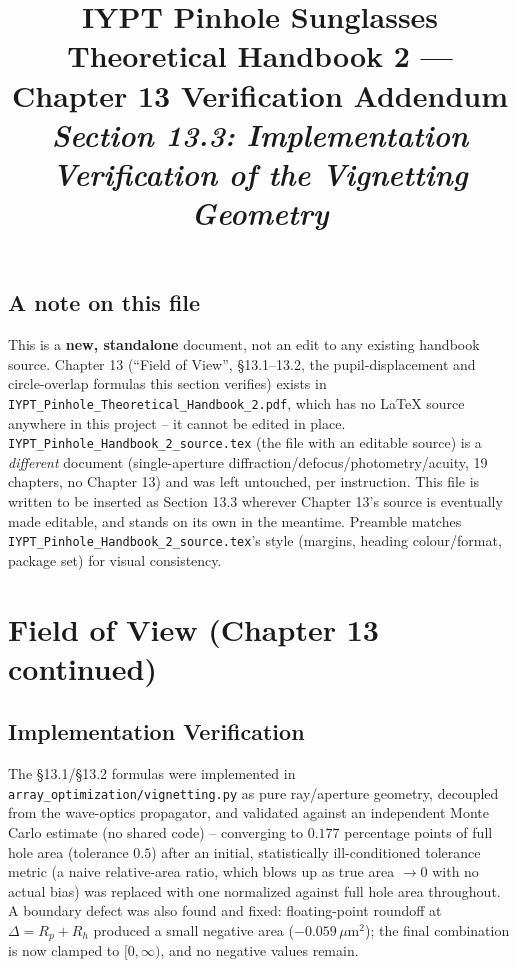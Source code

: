 \documentclass[11pt]{report}
\title{\textbf{\Huge IYPT Pinhole Sunglasses}\\[0.3cm]\textcolor{hbblue}{\huge Theoretical Handbook 2 --- Chapter 13 Verification Addendum}\\[0.5cm]
\large\itshape Section 13.3: Implementation Verification of the Vignetting Geometry}
\author{}
\date{}
\begin{document}
\maketitle
\tableofcontents

\section*{A note on this file}
This is a \textbf{new, standalone} document, not an edit to any existing handbook source.
Chapter 13 (``Field of View'', \S13.1--13.2, the pupil-displacement and circle-overlap
formulas this section verifies) exists in \texttt{IYPT\_Pinhole\_Theoretical\_Handbook\_2.pdf},
which has no \LaTeX{} source anywhere in this project -- it cannot be edited in place.
\texttt{IYPT\_Pinhole\_Handbook\_2\_source.tex} (the file with an editable source) is a
\emph{different} document (single-aperture diffraction/defocus/photometry/acuity, 19
chapters, no Chapter 13) and was left untouched, per instruction. This file is written to
be inserted as Section 13.3 wherever Chapter 13's source is eventually made editable, and
stands on its own in the meantime. Preamble matches \texttt{IYPT\_Pinhole\_Handbook\_2\_source.tex}'s
style (margins, heading colour/format, package set) for visual consistency.

\setcounter{chapter}{12}
\chapter{Field of View (Chapter 13 continued)}
\setcounter{section}{2}

\section{Implementation Verification}
\label{sec:ch13-verification}

The \S13.1/\S13.2 formulas were implemented in \texttt{array\_optimization/vignetting.py}
as pure ray/aperture geometry, decoupled from the wave-optics propagator, and validated
against an independent Monte Carlo estimate (no shared code) -- converging to
$0.177$ percentage points of full hole area (tolerance $0.5$) after an initial,
statistically ill-conditioned tolerance metric (a naive relative-area ratio, which blows
up as true area $\to 0$ with no actual bias) was replaced with one normalized against
full hole area throughout. A boundary defect was also found and fixed: floating-point
roundoff at $\Delta = R_p{+}R_h$ produced a small negative area ($-0.059\,\mu\text{m}^2$);
the final combination is now clamped to $[0,\infty)$, and no negative values remain.
\end{document}
